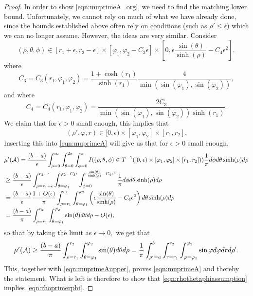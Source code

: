 \documentclass[10pt,a4paper]{amsart}
\newcommand{\CA}{{\mathcal{A}}}
\newcommand{\dd}{{\rm d}}
\begin{document}
\begin{proof}
In order to show \eqref{eqn:muprimeA_org}, we need to find the matching lower bound. 
Unfortunately, we cannot rely on much of what we have already done, since the bounds 
established above often rely on conditions (such as $\rho'\leq \epsilon$) which we can no 
longer assume. However, the ideas are very similar. Consider
\begin{equation} \label{eqn:rhothetaphiassumption}
 (\rho,\theta,\phi)
\in [r_1+\epsilon,r_2-\epsilon] \times [\varphi_1,\varphi_2-C_3\epsilon] 
\times \left[0,\epsilon\frac{\sin(\theta)}{\sinh(\rho)} -C_4 \epsilon^2\right],
\end{equation}
where
\[
C_3=C_3(r_1,\varphi_1,\varphi_2)
=\frac{1+\cosh(r_1)}{\sinh(r_1)}\frac{4}{\min(\sin(\varphi_1),\sin(\varphi_2))},
\]
and where 
\[
C_4=C_4(r_1,\varphi_1,\varphi_2)
=\frac{2C_3}{\min(\sin(\varphi_1),\sin(\varphi_2))\sinh(r_1)}.
\]
We claim that for $\epsilon>0$ small enough, this implies that 
\begin{equation} \label{eqn:rhoprimerphi}
(\rho',\varphi,r)
\in [0,\epsilon)\times [\varphi_1,\varphi_2] \times [r_1,r_2] .
\end{equation}
Inserting this into \eqref{eqn:muprimeA} will give us that for $\epsilon>0$ small enough,
\begin{align*}
& \mu'(\CA)=\frac{(b-a)}{\epsilon}
\int_{\rho=0}^\infty  \int_{\theta=0}^{2 \pi} \int_{\phi=0}^{\pi} 
I((\rho,\theta,\phi)\in T^{-1}([0,\epsilon) \times [\varphi_1,\varphi_2] \times [r_1,r_2])) 
\frac{1}{\pi}\dd \phi \dd \theta \sinh(\rho) \dd \rho \nonumber \\
& \geq \frac{(b-a)}{\epsilon}
\int_{\rho=r_1+\epsilon}^{r_2-\epsilon}
\int_{\theta=\varphi_1}^{\varphi_2-C_3\epsilon}  
\int_{\phi=0}^{\epsilon\frac{\sin(\theta)}{\sinh(\rho)}-C_4 \epsilon^2}
\frac{1}{\pi}\dd \phi \dd \theta \sinh(\rho) \dd \rho \nonumber \\
& =\frac{(b-a)}{\epsilon}\frac{1+O(\epsilon)}{\pi}
\int_{\rho=r_1}^{r_2}  \int_{\theta=\varphi_1}^{\varphi_2}  
\left(\epsilon\frac{\sin(\theta)}{\sinh(\rho)} -C_4 \epsilon^2\right)
\dd \theta \sinh(\rho) \dd \rho \nonumber \\
& =\frac{(b-a)}{\pi}\int_{\rho=r_1}^{r_2}  \int_{\theta=\varphi_1}^{\varphi_2}  \sin(\theta) \dd \theta \dd \rho 
-O(\epsilon), \nonumber
\end{align*}
so that by taking the limit as $\epsilon\to 0,$ 
we get that 
\[
\mu'(\CA)\geq \frac{(b-a)}{\pi}\int_{\rho=r_1}^{r_2}  
\int_{\theta=\varphi_1}^{\varphi_2} 
\sin(\theta) \dd \theta \dd \rho 
=\frac{1}{\pi}\int_{\rho'=a}^b \int_{r=r_1}^{r_2} 
\int_{\varphi=\varphi_1}^{\varphi_2} 
\sin \varphi \dd \varphi \dd r \dd \rho'.  
\]
This, together with \eqref{eqn:muprimeAupper}, proves \eqref{eqn:muprimeA} and thereby the statement. 
What is left is therefore to show that
\eqref{eqn:rhothetaphiassumption} implies \eqref{eqn:rhoprimerphi}. 



\end{proof}
\end{document}
